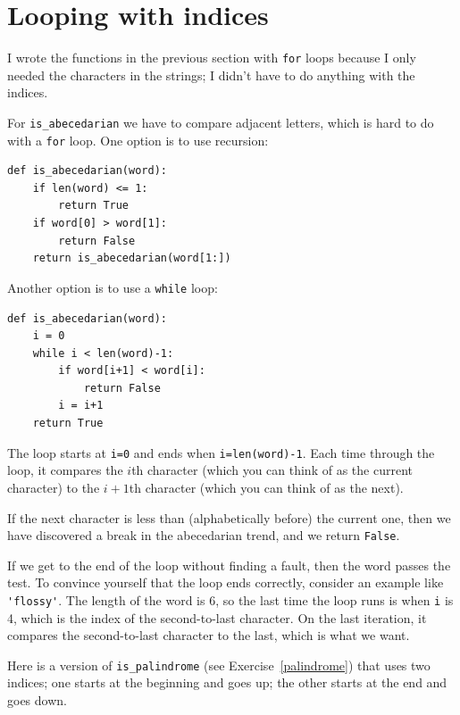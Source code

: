 \documentclass[10pt]{book}
\begin{document}


\section{Looping with indices}


I wrote the functions in the previous section with {\tt for}
loops because I only needed the characters in the strings; I didn't
have to do anything with the indices.

For \verb"is_abecedarian" we have to compare adjacent letters,
which is hard to do with a {\tt for} loop.  One option is to
use recursion:

\beforeverb
\begin{verbatim}
def is_abecedarian(word):
    if len(word) <= 1:
        return True
    if word[0] > word[1]:
        return False
    return is_abecedarian(word[1:])
\end{verbatim}
\afterverb

Another option is to use a {\tt while} loop:

\beforeverb
\begin{verbatim}
def is_abecedarian(word):
    i = 0
    while i < len(word)-1:
        if word[i+1] < word[i]:
            return False
        i = i+1
    return True
\end{verbatim}
\afterverb
%
The loop starts at {\tt i=0} and ends when {\tt i=len(word)-1}.  Each
time through the loop, it compares the $i$th character (which you can
think of as the current character) to the $i+1$th character (which you
can think of as the next).

If the next character is less than (alphabetically before) the current
one, then we have discovered a break in the abecedarian trend, and
we return {\tt False}.

If we get to the end of the loop without finding a fault, then the
word passes the test.  To convince yourself that the loop ends
correctly, consider an example like \verb"'flossy'".  The
length of the word is 6, so
the last time the loop runs is when {\tt i} is 4, which is the
index of the second-to-last character.  On the last iteration,
it compares the second-to-last character to the last, which is
what we want.


Here is a version of \verb"is_palindrome" (see
Exercise~\ref{palindrome}) that uses two indices; one starts at the
beginning and goes up; the other starts at the end and goes down.
\end{document}

